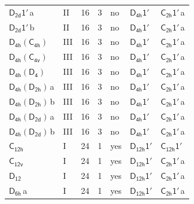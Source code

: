 \documentclass[10pt,a4paper]{article}
\numberwithin{equation}{section}
\newcommand{\grp}[1]{\mathsf{#1}}
\newcommand{\clsletter}[1]{\,{\scriptsize\color{black!55}#1}}
\begin{document}
{\begin{longtable}{@{}llrrlll@{}}
\href{D2d-1p.pdf}{$\grp{D_{2d}1'}$}\clsletter{a} & II & 16 & 3 & no & \href{D4h-1p.pdf}{$\grp{D_{4h}1'}$} & \href{C2h-1p.pdf}{$\grp{C_{2h}1'}$}\clsletter{a}\\
\href{D2d-1p.pdf}{$\grp{D_{2d}1'}$}\clsletter{b} & II & 16 & 3 & no & \href{D4h-1p.pdf}{$\grp{D_{4h}1'}$} & \href{C2h-1p.pdf}{$\grp{C_{2h}1'}$}\clsletter{a}\\
\href{D4h-C4h.pdf}{$\grp{D_{4h}}(\grp{C_{4h}})$} & III & 16 & 3 & no & \href{D4h-1p.pdf}{$\grp{D_{4h}1'}$} & \href{C2h-1p.pdf}{$\grp{C_{2h}1'}$}\clsletter{a}\\
\href{D4h-C4v.pdf}{$\grp{D_{4h}}(\grp{C_{4v}})$} & III & 16 & 3 & no & \href{D4h-1p.pdf}{$\grp{D_{4h}1'}$} & \href{C2h-1p.pdf}{$\grp{C_{2h}1'}$}\clsletter{a}\\
\href{D4h-D4.pdf}{$\grp{D_{4h}}(\grp{D_{4}})$} & III & 16 & 3 & no & \href{D4h-1p.pdf}{$\grp{D_{4h}1'}$} & \href{C2h-1p.pdf}{$\grp{C_{2h}1'}$}\clsletter{a}\\
\href{D4h-D2h.pdf}{$\grp{D_{4h}}(\grp{D_{2h}})$}\clsletter{a} & III & 16 & 3 & no & \href{D4h-1p.pdf}{$\grp{D_{4h}1'}$} & \href{C2h-1p.pdf}{$\grp{C_{2h}1'}$}\clsletter{a}\\
\href{D4h-D2h.pdf}{$\grp{D_{4h}}(\grp{D_{2h}})$}\clsletter{b} & III & 16 & 3 & no & \href{D4h-1p.pdf}{$\grp{D_{4h}1'}$} & \href{C2h-1p.pdf}{$\grp{C_{2h}1'}$}\clsletter{a}\\
\href{D4h-D2d.pdf}{$\grp{D_{4h}}(\grp{D_{2d}})$}\clsletter{a} & III & 16 & 3 & no & \href{D4h-1p.pdf}{$\grp{D_{4h}1'}$} & \href{C2h-1p.pdf}{$\grp{C_{2h}1'}$}\clsletter{a}\\
\href{D4h-D2d.pdf}{$\grp{D_{4h}}(\grp{D_{2d}})$}\clsletter{b} & III & 16 & 3 & no & \href{D4h-1p.pdf}{$\grp{D_{4h}1'}$} & \href{C2h-1p.pdf}{$\grp{C_{2h}1'}$}\clsletter{a}\\
\href{../../../rotation/data/pdf/C12h.pdf}{$\grp{C_{12h}}$} & I & 24 & 1 & yes & \href{D12h-1p.pdf}{$\grp{D_{12h}1'}$} & \href{C12h-1p.pdf}{$\grp{C_{12h}1'}$}\\
\href{../../../rotation/data/pdf/C12v.pdf}{$\grp{C_{12v}}$} & I & 24 & 1 & yes & \href{D12h-1p.pdf}{$\grp{D_{12h}1'}$} & \href{C2h-1p.pdf}{$\grp{C_{2h}1'}$}\clsletter{a}\\
\href{../../../rotation/data/pdf/D12.pdf}{$\grp{D_{12}}$} & I & 24 & 1 & yes & \href{D12h-1p.pdf}{$\grp{D_{12h}1'}$} & \href{C2h-1p.pdf}{$\grp{C_{2h}1'}$}\clsletter{a}\\
\href{../../../rotation/data/pdf/D6h.pdf}{$\grp{D_{6h}}$}\clsletter{a} & I & 24 & 1 & yes & \href{D12h-1p.pdf}{$\grp{D_{12h}1'}$} & \href{C2h-1p.pdf}{$\grp{C_{2h}1'}$}\clsletter{a}\\

\end{longtable}}
\end{document}

